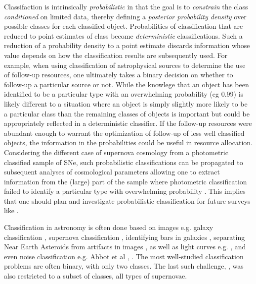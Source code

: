 Classifaction is intrinsically \textit{probabilistic} in that the goal is to \textit{constrain} the class \textit{conditioned} on limited data, thereby defining a \textit{posterior probability density} over possible classes for each classified object.
Probabilities of classification that are reduced to point estimates of class become \textit{deterministic} classifications.
Such a reduction of a probability density to a point estimate discards information whose value depends on how the classification results are subsequently used.
For example, when using classification of astrophysical sources to determine the use of follow-up resources, one ultimately takes a binary decision on whether to follow-up a particular source or not.
While the knowlege that an object has been identified to be a particular type with an overwhelming probability (eg 0.99) is likely different to a situation where an object is simply slightly more likely to be a particular class than the remaining classes of objects is important but could be appropriately reflected in a deterministic classifier.
If the follow-up resources were abundant enough to warrant the optimization of follow-up of less well classified objects, the information in the probabilities could be useful in resource allocation.
Considering the different case of supernova cosmology from a photometric classified sample of SNe, such probabilistic classifications can be propagated to subsequent analyses of cosmological parameters allowing one to extract information from the (large) part of the sample where photometric classification failed to identify a particular type with overwhelming probability \cite{roberts_zbeams:_2017}.
This implies that one should plan and investigate probabilistic classification for future surveys like \lsst.

Classification in astronomy is often done based on images e.g. galaxy classification \citep{2016A&C....16...34H}, supernova classification \citep{2017ApJ...836...97C}
, identifying bars in galaxies \citep{2018MNRAS.477..894A}, separating Near Earth Asteroids from artifacts in images \citep{2016PASJ...68..104M}, as well as light curves e.g. \citet{2016PASJ...68..104M, 2017arXiv170906257M, 2017CQGra..34f4003Z}, and even noise classification e.g. Abbot et al
, \citet{2017CQGra..34f4003Z, 2018PhRvD..97j1501G}.
The most well-studied classification problems are often binary, with only two classes.
The last such challenge, \snphotcc \citep{kessler_supernova_2010}, was also restricted to a subset of classes, all types of supernovae.

